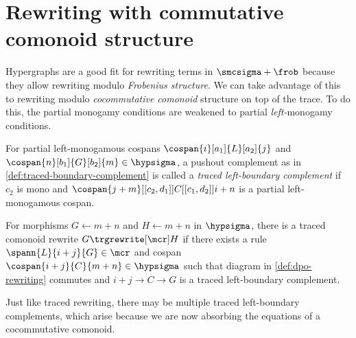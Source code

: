 \section{Rewriting with commutative comonoid structure}

Hypergraphs are a good fit for rewriting terms in
\(\smcsigma + \frob\) because they allow rewriting modulo
\emph{Frobenius structure}.
We can take advantage of this to rewriting modulo
\emph{cocommutative comonoid} structure on top of the trace.
To do this, the partial monogamy conditions are weakened to
partial \emph{left-}monogamy conditions.

\begin{definition}
    \label{def:traced-left-boundary-complement}
    For partial left-monogamous cospans \(
    \cospan{i}[a_1]{L}[a_2]{j}
    \) and \(
    \cospan{n}[b_1]{G}[b_2]{m} \in \hypsigma
    \), a pushout complement as in \cref{def:traced-boundary-complement}
    is called a \emph{traced left-boundary complement} if \(c_2\)
    is mono and \(
    \cospan{j + m}[[c_2,d_1]]{C}[[c_1,d_2]]{{i + n}}
    \) is a partial left-monogamous cospan.
\end{definition}

\begin{definition}
    For morphisms \(G \leftarrow m+n\) and \(H \leftarrow m+n\) in
    \(\hypsigma\), there is a traced comonoid rewrite \(G \trgrewrite[\mcr] H\)
    if there exists a rule \(
    \spann{L}{i + j}{G} \in \mcr
    \) and cospan \(
    \cospan{i + j}{C}{m + n} \in \hypsigma
    \) such that diagram in \cref{def:dpo-rewriting} commutes and
    \(i + j \to C \to G\) is a
    traced left-boundary complement.
\end{definition}

Just like traced rewriting, there may be multiple traced left-boundary
complements, which arise because we are now absorbing the equations of a
cocommutative comonoid.


